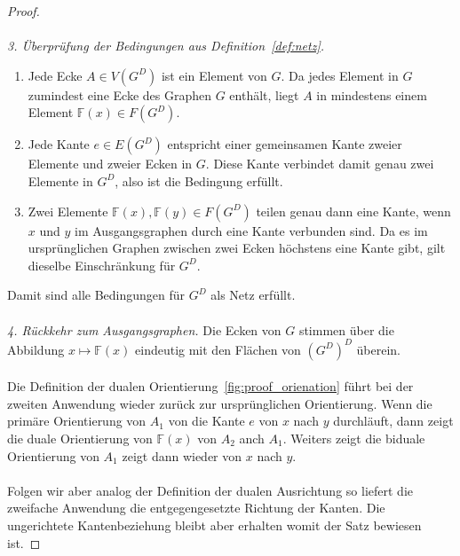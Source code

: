 \documentclass[11pt,a4paper,leqno]{report}
\numberwithin{equation}{chapter}
\begin{document}
\begin{proof}
	\\
	\\
	\smallskip	
	\smallskip
	\emph{3. Überprüfung der Bedingungen aus Definition~\ref{def:netz}.}  
	\begin{enumerate}
		\item Jede Ecke $A \in V(G^D)$ ist ein Element von $G$. Da jedes Element in $G$ zumindest eine Ecke des Graphen $G$ enthält, liegt $A$ in mindestens einem Element $\mathbb{F}(x) \in F(G^D)$.
		\item Jede Kante $e \in E(G^D)$ entspricht einer gemeinsamen Kante zweier Elemente und zweier Ecken in $G$. Diese Kante verbindet damit genau zwei Elemente in $G^D$, also ist die Bedingung erfüllt.
		\item Zwei Elemente $\mathbb{F}(x), \mathbb{F}(y) \in F(G^D)$ teilen genau dann eine Kante, wenn $x$ und $y$ im Ausgangsgraphen durch eine Kante verbunden sind. Da es im ursprünglichen Graphen zwischen zwei Ecken höchstens eine Kante gibt, gilt dieselbe Einschränkung für $G^D$.
	\end{enumerate}
	Damit sind alle Bedingungen für $G^D$ als Netz erfüllt.
	\\
	\\
	\smallskip
	\emph{4. Rückkehr zum Ausgangsgraphen.}  
	Die Ecken von $G$ stimmen über die Abbildung $x \mapsto \mathbb{F}(x)$ eindeutig mit den Flächen von $(G^D)^D$ überein.
	\\
	\\
	Die Definition der dualen Orientierung~\ref{fig:proof_orienation} führt bei der zweiten Anwendung wieder zurück zur ursprünglichen Orientierung. Wenn die primäre Orientierung von $A_1$ von die Kante $e$ von $x$ nach $y$ durchläuft, dann zeigt die duale Orientierung von $\mathbb{F}(x)$ von $A_2$ anch $A_1$. Weiters zeigt die biduale Orientierung von $A_1$ zeigt dann wieder von $x$ nach $y$.
	\\
	\\
	Folgen wir aber analog der Definition der dualen Ausrichtung so liefert die zweifache Anwendung die entgegengesetzte Richtung der Kanten. Die ungerichtete Kantenbeziehung bleibt aber erhalten womit der Satz bewiesen ist.
\end{proof}
\end{document}
